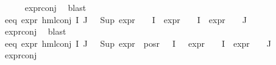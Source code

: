 \begin{isabellebody}
\ \ \ \ \isamarkupfalse%
\ expr{\isacharunderscore}{\kern0pt}{}{\isacharunderscore}{\kern0pt}conj\ \isamarkupfalse%
\ blast\isanewline
\ \ \isamarkupfalse%
\ e{}{\isacharunderscore}{\kern0pt}eq{\isacharcolon}{\kern0pt}\ {\isachardoublequoteopen}expr{\isacharunderscore}{\kern0pt}{}\ {\isacharparenleft}{\kern0pt}hml{\isacharunderscore}{\kern0pt}conj\ I\ J\ {\isasymPhi}{\isacharparenright}{\kern0pt}\ {\isacharequal}{\kern0pt}\ {\isacharparenleft}{\kern0pt}Sup\ {\isacharparenleft}{\kern0pt}{\isacharparenleft}{\kern0pt}expr{\isacharunderscore}{\kern0pt}{}\ {\isasymcirc}\ {\isasymPhi}{\isacharparenright}{\kern0pt}\ {\isacharbackquote}{\kern0pt}\ I\ {\isasymunion}\ {\isacharparenleft}{\kern0pt}expr{\isacharunderscore}{\kern0pt}{}\ {\isasymcirc}\ {\isasymPhi}{\isacharparenright}{\kern0pt}\ {\isacharbackquote}{\kern0pt}\ I\ {\isasymunion}\ {\isacharparenleft}{\kern0pt}expr{\isacharunderscore}{\kern0pt}{}\ {\isasymcirc}\ {\isasymPhi}{\isacharparenright}{\kern0pt}\ {\isacharbackquote}{\kern0pt}\ J{\isacharparenright}{\kern0pt}{\isacharparenright}{\kern0pt}{\isachardoublequoteclose}\isanewline
\ \ \ \ \isamarkupfalse%
\ expr{\isacharunderscore}{\kern0pt}{}{\isacharunderscore}{\kern0pt}conj\ \isamarkupfalse%
\ blast\isanewline
\ \ \isamarkupfalse%
\ e{}{\isacharunderscore}{\kern0pt}eq{\isacharcolon}{\kern0pt}\ {\isachardoublequoteopen}expr{\isacharunderscore}{\kern0pt}{}\ {\isacharparenleft}{\kern0pt}hml{\isacharunderscore}{\kern0pt}conj\ I\ J\ {\isasymPhi}{\isacharparenright}{\kern0pt}\ {\isacharequal}{\kern0pt}\ Sup\ {\isacharparenleft}{\kern0pt}{\isacharparenleft}{\kern0pt}expr{\isacharunderscore}{\kern0pt}{}\ {\isacharbackquote}{\kern0pt}\ {\isacharparenleft}{\kern0pt}pos{\isacharunderscore}{\kern0pt}r\ {\isacharparenleft}{\kern0pt}{\isasymPhi}\ {\isacharbackquote}{\kern0pt}\ I{\isacharparenright}{\kern0pt}{\isacharparenright}{\kern0pt}{\isacharparenright}{\kern0pt}\ \ {\isasymunion}\ {\isacharparenleft}{\kern0pt}expr{\isacharunderscore}{\kern0pt}{}\ {\isasymcirc}\ {\isasymPhi}{\isacharparenright}{\kern0pt}\ {\isacharbackquote}{\kern0pt}\ I\ {\isasymunion}\ {\isacharparenleft}{\kern0pt}expr{\isacharunderscore}{\kern0pt}{}\ {\isasymcirc}\ {\isasymPhi}{\isacharparenright}{\kern0pt}\ {\isacharbackquote}{\kern0pt}\ J{\isacharparenright}{\kern0pt}{\isachardoublequoteclose}\isanewline
\ \ \ \ \isamarkupfalse%
\ expr{\isacharunderscore}{\kern0pt}{}{\isacharunderscore}{\kern0pt}conj\ \isamarkupfalse%

\end{isabellebody}
